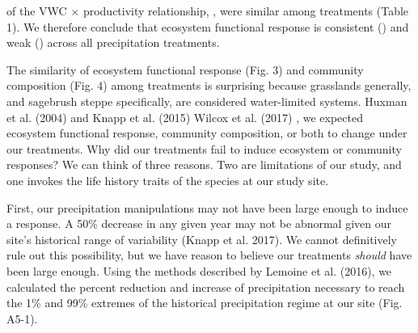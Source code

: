 \documentclass[fleqn,10pt,lineno]{wlpeerj} %
\begin{document}
of the VWC \(\times\) productivity relationship,
, were similar among treatments (Table 1). We
therefore conclude that ecosystem functional response is consistent
() and weak ()
across all precipitation treatments.

The similarity of ecosystem functional response (Fig. 3) and community
composition (Fig. 4) among treatments is surprising because grasslands
generally, and sagebrush steppe specifically, are considered
water-limited systems.  Huxman et al. (2004) and Knapp
et al. (2015)
Wilcox et al. (2017)
, we expected ecosystem functional
response, community composition, or both to change under our treatments.
Why did our treatments fail to induce ecosystem or community responses?
We can think of three reasons. Two are limitations of our study, and one
invokes the life history traits of the species at our study site.

First, our precipitation manipulations may not have been large enough to
induce a response. A 50\% decrease in any given year may not be abnormal
given our site's historical range of variability (Knapp et al. 2017). We
cannot definitively rule out this possibility, but we have reason to
believe our treatments \emph{should} have been large enough. Using the
methods described by Lemoine et al. (2016), we calculated the percent
reduction and increase of  precipitation necessary to
reach the 1\% and 99\% extremes of the historical precipitation regime
at our site (Fig. A5-1).
\end{document}
